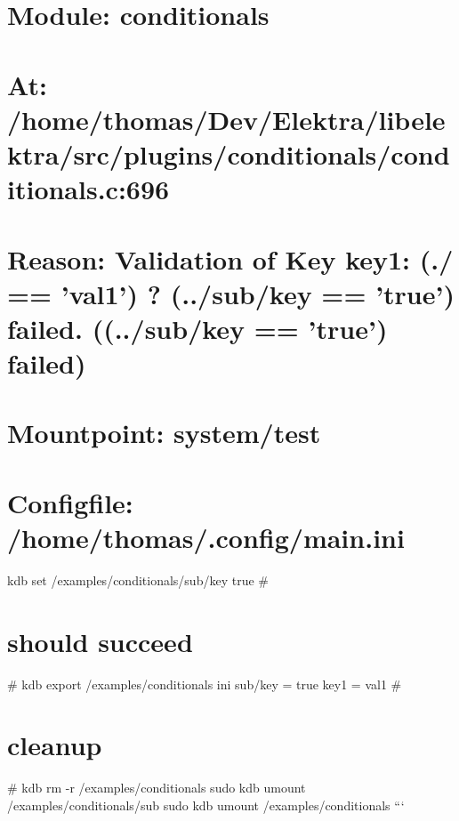 \section*{Module\+: conditionals}

\section*{At\+: /home/thomas/\+Dev/\+Elektra/libelektra/src/plugins/conditionals/conditionals.c\+:696}

\section*{Reason\+: Validation of Key key1\+: (./ == 'val1') ? (../sub/key == 'true') failed. ((../sub/key == 'true') failed)}

\section*{Mountpoint\+: system/test}

\section*{Configfile\+: /home/thomas/.config/main.\+ini}

kdb set /examples/conditionals/sub/key true \# \section*{should succeed}

\# kdb export /examples/conditionals ini sub/key = true key1 = val1 \# \section*{cleanup}

\# kdb rm -\/r /examples/conditionals sudo kdb umount /examples/conditionals/sub sudo kdb umount /examples/conditionals ``` 